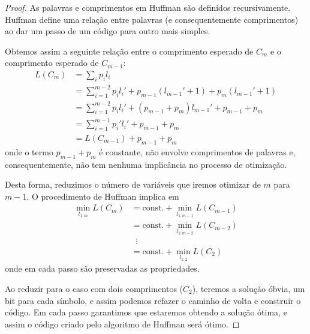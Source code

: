 \begin{proof}
As palavras e comprimentos em Huffman são definidos recursivamente. Huffman define uma relação entre palavras
(e consequentemente comprimentos) ao dar um passo de um código para outro mais simples.

Obtemos assim a seguinte relação entre o comprimento esperado de $C_m$ e o comprimento esperado de $C_{m-1}$:
\begin{subequations}
  \begin{align}
    L(C_m) &= \sum_i p_i l_i\\
           &= \sum_{i=1}^{m-2} p_i l_i' + p_{m-1} (l_{m-1}' + 1) + p_m (l_{m-1}' + 1) \\
           &= \sum_{i=1}^{m-2} p_i l_i' + (p_{m-1} + p_m) l_{m-1}' + p_{m-1} + p_m \\
           &= \sum_{i=1}^{m-1} p_i' l_i'+ p_{m-1} + p_m \\
           &= L(C_{m-1}) + p_{m-1} + p_m
  \end{align}
\end{subequations} 
onde o termo $p_{m-1} + p_m$ é constante, não envolve comprimentos de palavras e, consequentemente,
não tem nenhuma implicância no processo de otimização.

Desta forma, reduzimos o número de variáveis que iremos otimizar de $m$ para $m-1$.
O procedimento de Huffman implica em 
\begin{subequations}
  \begin{align}
    \min_{l_{1:m}} L(C_m) &= \text{const.} + \min_{l_{1:m-1}} L(C_{m-1}) \\
                          &= \text{const.} + \min_{l_{1:m-2}} L(C_{m-2}) \\
                          & \;\; \vdots \nonumber \\
                          &= \text{const.} + \min_{l_{1:2}} L(C_{2})
  \end{align}
\end{subequations}
onde em cada passo são preservadas as propriedades.

Ao reduzir para o caso com dois comprimentos ($C_2$), teremos a solução óbvia, um bit para cada símbolo, e assim 
podemos refazer o caminho de volta e construir o código.
Em cada passo garantimos que estaremos obtendo a solução ótima, e assim o código criado pelo algoritmo de Huffman
será ótimo.
\end{proof}
